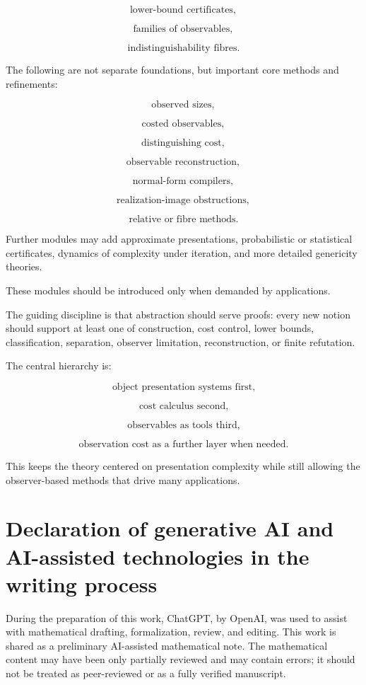\documentclass[11pt]{article}
\begin{document}
\[
\text{lower-bound certificates},
\]

\[
\text{families of observables},
\]

\[
\text{indistinguishability fibres}.
\]

The following are not separate foundations, but important core methods and refinements:

\[
\text{observed sizes},
\]

\[
\text{costed observables},
\]

\[
\text{distinguishing cost},
\]

\[
\text{observable reconstruction},
\]

\[
\text{normal-form compilers},
\]

\[
\text{realization-image obstructions},
\]

\[
\text{relative or fibre methods}.
\]

Further modules may add approximate presentations, probabilistic or statistical certificates, dynamics of complexity under iteration, and more detailed genericity theories.

These modules should be introduced only when demanded by applications.

The guiding discipline is that abstraction should serve proofs: every new notion should support at least one of construction, cost control, lower bounds, classification, separation, observer limitation, reconstruction, or finite refutation.

The central hierarchy is:

\[
\text{object presentation systems first,}
\]

\[
\text{cost calculus second,}
\]

\[
\text{observables as tools third,}
\]

\[
\text{observation cost as a further layer when needed.}
\]

This keeps the theory centered on presentation complexity while still allowing the observer-based methods that drive many applications.

\section*{Declaration of generative AI and AI-assisted technologies in the writing process}
During the preparation of this work, ChatGPT, by OpenAI, was used to assist with mathematical drafting, formalization, review, and editing. This work is shared as a preliminary AI-assisted mathematical note. The mathematical content may have been only partially reviewed and may contain errors; it should not be treated as peer-reviewed or as a fully verified manuscript.
\end{document}
